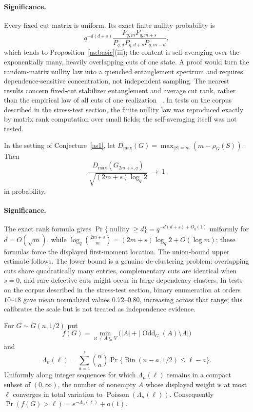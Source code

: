 \paragraph{Significance.}
Every fixed cut matrix is uniform.  Its exact finite nullity probability is
\[
 q^{-d(d+s)}
 \frac{P_{q,m}P_{q,m+s}}
 {P_{q,d}P_{q,d+s}P_{q,m-d}},
\]
which tends to Proposition~\ref{as:basic}(iii); the content is self-averaging
over the exponentially many, heavily overlapping cuts of one state.  A proof
would turn the random-matrix nullity law into a quenched entanglement spectrum
and requires dependence-sensitive concentration, not independent sampling.
The nearest results concern fixed-cut stabilizer entanglement and average cut
rank, rather than the empirical law of all cuts of one realization
~\cite{NguyenOum20}.  In tests on the corpus described in the stress-test section, the finite nullity law was reproduced exactly by matrix rank
computation over small fields; the self-averaging itself was not tested.

\begin{conjecture}\label{as2}
In the setting of Conjecture~\ref{as1}, let
$D_{\max}(G)=\max_{|S|=m}(m-\rho_G(S))$.  Then
\[
 \frac{D_{\max}(G_{2m+s,q})}
 {\sqrt{(2m+s)\log_q2}}\ \longrightarrow\ 1
\]
in probability.
\end{conjecture}

\paragraph{Significance.}
The exact rank formula gives
$\Pr\{\operatorname{nullity}\ge d\}=q^{-d(d+s)+O_q(1)}$ uniformly for
$d=O(\sqrt m)$, while
$\log_q\binom{2m+s}{m}=(2m+s)\log_q2+O(\log m)$; these formulas force the
displayed first-moment location.  The union-bound upper estimate follows.
The lower bound is a genuine de-clustering problem: overlapping cuts share
quadratically many entries, complementary cuts are identical when $s=0$,
and rare defective cuts might occur in large dependency clusters.  In tests on the corpus described in the stress-test section, binary
enumeration at orders $10$--$18$ gave mean normalized values $0.72$--$0.80$,
increasing across that range; this calibrates the scale but is not treated as
independence evidence.

\begin{conjecture}\label{as3}
For $G\sim G(n,1/2)$ put
\[
 f(G)=\min_{\varnothing\ne A\subseteq V}
 \bigl(|A|+|\operatorname{Odd}_G(A)\setminus A|\bigr)
\]
and
\[
 \Lambda_n(\ell)=\sum_{a=1}^{\ell}\binom na
 \Pr\{\operatorname{Bin}(n-a,1/2)\le \ell-a\}.
\]
Uniformly along integer sequences for which $\Lambda_n(\ell)$ remains in a
compact subset of $(0,\infty)$, the number of nonempty $A$ whose displayed
weight is at most $\ell$ converges in total variation to
$\operatorname{Poisson}(\Lambda_n(\ell))$.  Consequently
$\Pr(f(G)>\ell)=e^{-\Lambda_n(\ell)}+o(1)$.
\end{conjecture}

